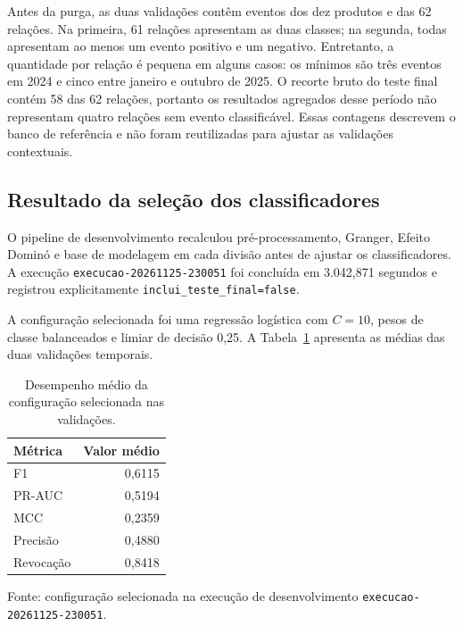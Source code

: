 \documentclass[12pt,a4paper]{article}
\begin{document}
Antes da purga, as duas validações contêm eventos dos dez produtos e das 62
relações. Na primeira, 61 relações apresentam as duas classes; na segunda,
todas apresentam ao menos um evento positivo e um negativo. Entretanto, a
quantidade por relação é pequena em alguns casos: os mínimos são três eventos
em 2024 e cinco entre janeiro e outubro de 2025. O recorte bruto do teste final
contém 58 das 62 relações, portanto os resultados agregados desse período não
representam quatro relações sem evento classificável. Essas contagens descrevem
o banco de referência e não foram reutilizadas para ajustar as validações
contextuais.

\subsection{Resultado da seleção dos classificadores}

O pipeline de desenvolvimento recalculou pré-processamento, Granger, Efeito
Dominó e base de modelagem em cada divisão antes de ajustar os classificadores.
A execução \texttt{execucao-20261125-230051} foi concluída em 3.042,871
segundos e registrou explicitamente \texttt{inclui\_teste\_final=false}.

A configuração selecionada foi uma regressão logística com $C=10$, pesos de
classe balanceados e limiar de decisão 0,25. A Tabela~\ref{tab:modelo-selecionado}
apresenta as médias das duas validações temporais.

\begin{table}[htbp]
    \centering
    \caption{Desempenho médio da configuração selecionada nas validações.}
    \label{tab:modelo-selecionado}
    \small
    \begin{tabular}{lr}
        \toprule
        \textbf{Métrica} & \textbf{Valor médio} \\
        \midrule
        F1 & 0,6115 \\
        PR-AUC & 0,5194 \\
        MCC & 0,2359 \\
        Precisão & 0,4880 \\
        Revocação & 0,8418 \\
        \bottomrule
    \end{tabular}

    \par\smallskip
    \footnotesize
    Fonte: configuração selecionada na execução de desenvolvimento
    \texttt{execucao-20261125-230051}.
\end{table}
\end{document}
